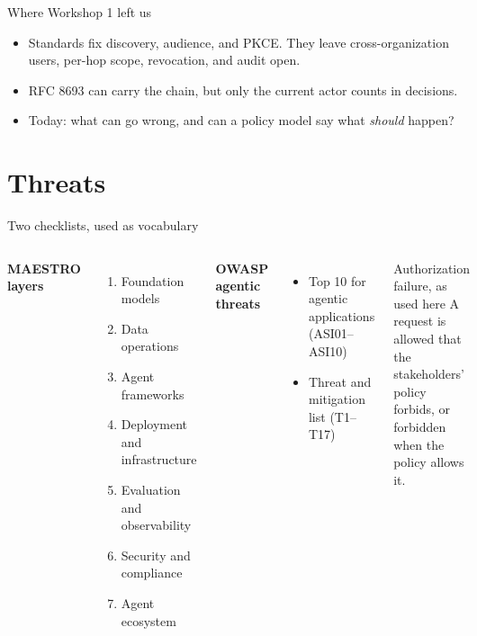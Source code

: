 \documentclass[aspectratio=169, 10pt]{beamer}
\begin{document}
\begin{frame}{Where Workshop 1 left us}
  \begin{itemize}\small
    \item Standards fix discovery, audience, and PKCE. They leave cross-organization users, per-hop scope, revocation, and audit open.
    \item RFC 8693 can carry the chain, but only the current actor counts in decisions.
    \item Today: what can go wrong, and can a policy model say what \emph{should} happen?
  \end{itemize}
\end{frame}

\section{Threats}

\begin{frame}{Two checklists, used as vocabulary}
  \begin{columns}[T]
    \textbf{MAESTRO layers} 
    \begin{enumerate}\scriptsize
      \item Foundation models
      \item Data operations
      \item Agent frameworks
      \item Deployment and infrastructure
      \item Evaluation and observability
      \item Security and compliance
      \item Agent ecosystem
    \end{enumerate}
    \textbf{OWASP agentic threats} 
    \begin{itemize}\scriptsize
      \item Top 10 for agentic applications (ASI01--ASI10)
      \item Threat and mitigation list (T1--T17)
    \end{itemize}
    \vspace{2mm}
    \begin{alertblock}{Authorization failure, as used here}\scriptsize
      A request is allowed that the stakeholders' policy forbids, or forbidden when the policy allows it.
    \end{alertblock}
  \end{columns}
\end{frame}
\end{document}

